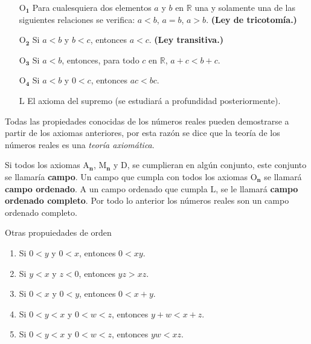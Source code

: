 \begin{itemize}
	\item[$\bm{\mathrm{O}_{1}}$] Para cualesquiera dos elementos $a$ y $b$ en $\mathbb{R}$ una y solamente una de las siguientes relaciones se verifica: $a<b$, $a = b$, $a>b$. \textbf{(Ley de tricotomía.)}
	\item[$\bm{\mathrm{O}_{2}}$] Si $a<b$ y $b<c$, entonces $a<c$. \textbf{(Ley transitiva.)}
	\item[$\bm{\mathrm{O}_{3}}$] Si $a<b$, entonces, para todo $c$ en $\mathbb{R}$,  $a+c < b+c$.
	\item[$\bm{\mathrm{O}_{4}}$] Si $a<b$ y $0<c$, entonces $ac<bc$.
	\item[$\bm{\mathrm{L}}$] El axioma del supremo (se estudiará a profundidad posteriormente). 
\end{itemize}


	Todas las propiedades conocidas de los números reales pueden demostrarse a partir de los axiomas anteriores, por esta razón se dice que la teoría de los números reales es una \textit{teoría axiomática}.
	
	Si todos los axiomas  $\bm{\mathrm{A}_{n}}$, $\bm{\mathrm{M}_{n}}$ y $\bm{\mathrm{D}}$, se cumplieran en algún conjunto, este conjunto se llamaría \textbf{campo}. Un campo que cumpla con todos los axiomas $\bm{\mathrm{O}_{n}}$ se llamará \textbf{campo ordenado}. A un campo ordenado que cumpla $\bm{\mathrm{L}}$, se le llamará \textbf{campo ordenado completo}. Por todo lo anterior los números reales son un campo ordenado completo.
	
	\vspace{0.21cm}
\begin{tcolorbox}[colback=blue!12!white]
	\begin{thm} Otras propuiedades de orden\end{thm}
	\begin{enumerate}
		\item Si $0 < y$ y $0 <x$, entonces $0 <xy$.
		\item Si $y < x$ y $z <0$, entonces $yz > xz$.
		\item Si $0<x$ y $0<y$, entonces $0 < x+y$.
		
		\item Si $0<y<x$ y $0<w<z$, entonces $y+w < x+z$.
		\item Si $0<y<x$ y $0<w<z$, entonces $yw < xz$.
	\end{enumerate}
\end{tcolorbox}

